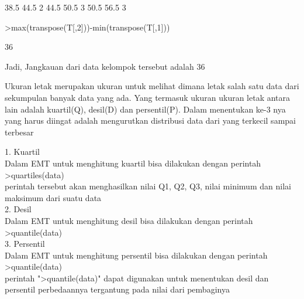 \documentclass[a4paper,10pt]{article}
\begin{document}
\begin{eulernotebook}
\begin{eulercomment}
\begin{eulercomment}
\begin{eulercomment}
\begin{eulercomment}
\begin{eulercomment}
\begin{eulercomment}
\begin{eulercomment}
\begin{eulercomment}
\begin{eulercomment}
\begin{eulercomment}
\begin{eulercomment}
\begin{eulercomment}
\begin{eulercomment}
\begin{eulercomment}
\begin{euleroutput}
         38.5      44.5         2
         44.5      50.5         3
         50.5      56.5         3
\end{euleroutput}
\begin{eulerprompt}
>max(transpose(T[,2]))-min(transpose(T[,1]))
\end{eulerprompt}
\begin{euleroutput}
  36
\end{euleroutput}
\begin{eulercomment}
Jadi, Jangkauan dari data kelompok tersebut adalah 36
\end{eulercomment}
\begin{eulercomment}
Ukuran letak merupakan ukuran untuk melihat dimana letak salah satu
data dari sekumpulan banyak data yang ada. Yang termasuk ukuran ukuran
letak antara lain adalah kuartil(Q), desil(D) dan persentil(P). Dalam
menentukan ke-3 nya yang harus diingat adalah mengurutkan distribusi
data dari yang terkecil sampai terbesar

1. Kuartil\\
Dalam EMT untuk menghitung kuartil bisa dilakukan dengan perintah\\
\textgreater{}quartiles(data)\\
perintah tersebut akan menghasilkan nilai Q1, Q2, Q3, nilai minimum
dan nilai maksimum dari suatu data\\
2. Desil\\
Dalam EMT untuk menghitung desil bisa dilakukan dengan perintah\\
\textgreater{}quantile(data)\\
3. Persentil\\
Dalam EMT untuk menghitung persentil bisa dilakukan dengan perintah\\
\textgreater{}quantile(data)\\
perintah "\textgreater{}quantile(data)" dapat digunakan untuk menentukan desil dan
persentil perbedaannya tergantung pada nilai dari pembaginya


\end{eulercomment}
\end{eulercomment}
\end{eulercomment}
\end{eulercomment}
\end{eulercomment}
\end{eulercomment}
\end{eulercomment}
\end{eulercomment}
\end{eulercomment}
\end{eulercomment}
\end{eulercomment}
\end{eulercomment}
\end{eulercomment}
\end{eulercomment}
\end{eulercomment}
\end{eulernotebook}
\end{document}
